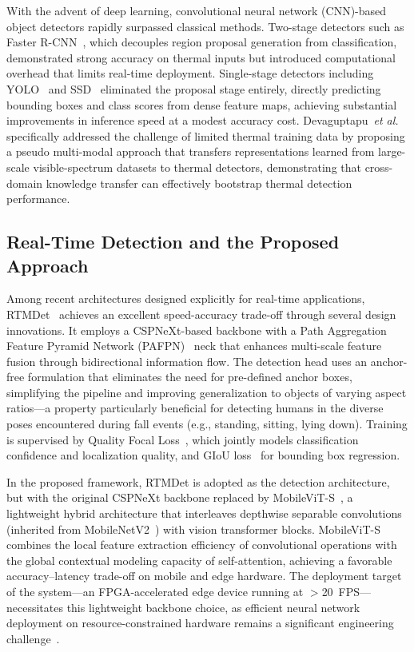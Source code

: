 With the advent of deep learning, convolutional neural network (CNN)-based object detectors rapidly surpassed classical methods. Two-stage detectors such as Faster R-CNN~\cite{ren2015faster}, which decouples region proposal generation from classification, demonstrated strong accuracy on thermal inputs but introduced computational overhead that limits real-time deployment. Single-stage detectors including YOLO~\cite{redmon2016yolo} and SSD~\cite{liu2016ssd} eliminated the proposal stage entirely, directly predicting bounding boxes and class scores from dense feature maps, achieving substantial improvements in inference speed at a modest accuracy cost. Devaguptapu~\emph{et al.}~\cite{devaguptapu2019borrow} specifically addressed the challenge of limited thermal training data by proposing a pseudo multi-modal approach that transfers representations learned from large-scale visible-spectrum datasets to thermal detectors, demonstrating that cross-domain knowledge transfer can effectively bootstrap thermal detection performance.

\subsection*{Real-Time Detection and the Proposed Approach}

Among recent architectures designed explicitly for real-time applications, RTMDet~\cite{lyu2022rtmdet} achieves an excellent speed-accuracy trade-off through several design innovations. It employs a CSPNeXt-based backbone with a Path Aggregation Feature Pyramid Network (PAFPN)~\cite{liu2018path} neck that enhances multi-scale feature fusion through bidirectional information flow. The detection head uses an anchor-free formulation that eliminates the need for pre-defined anchor boxes, simplifying the pipeline and improving generalization to objects of varying aspect ratios---a property particularly beneficial for detecting humans in the diverse poses encountered during fall events (e.g., standing, sitting, lying down). Training is supervised by Quality Focal Loss~\cite{li2020generalized}, which jointly models classification confidence and localization quality, and GIoU loss~\cite{rezatofighi2019generalized} for bounding box regression.

In the proposed framework, RTMDet is adopted as the detection architecture, but with the original CSPNeXt backbone replaced by MobileViT-S~\cite{mehta2022mobilevit}, a lightweight hybrid architecture that interleaves depthwise separable convolutions (inherited from MobileNetV2~\cite{sandler2018mobilenetv2}) with vision transformer blocks. MobileViT-S combines the local feature extraction efficiency of convolutional operations with the global contextual modeling capacity of self-attention, achieving a favorable accuracy--latency trade-off on mobile and edge hardware. The deployment target of the system---an FPGA-accelerated edge device running at $>$20~FPS---necessitates this lightweight backbone choice, as efficient neural network deployment on resource-constrained hardware remains a significant engineering challenge~\cite{sze2017efficient}.

